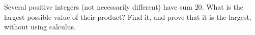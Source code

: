 Several positive integers (not necessarily different) have sum $20$. What is the largest possible value of their product? Find it, and prove that it is the largest, without using calculus.
